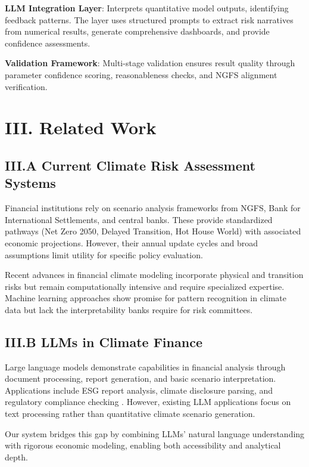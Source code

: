 \documentclass[10pt,twocolumn]{article}
\begin{document}
\textbf{LLM Integration Layer}: Interprets quantitative model outputs, identifying feedback patterns. The layer uses structured prompts to extract risk narratives from numerical results, generate comprehensive dashboards, and provide confidence assessments.

\textbf{Validation Framework}: Multi-stage validation ensures result quality through parameter confidence scoring, reasonableness checks, and NGFS alignment verification.

\section{III. Related Work}

\subsection{III.A Current Climate Risk Assessment Systems}

Financial institutions rely on scenario analysis frameworks from NGFS, Bank for International Settlements, and central banks. These provide standardized pathways (Net Zero 2050, Delayed Transition, Hot House World) with associated economic projections. However, their annual update cycles and broad assumptions limit utility for specific policy evaluation.

Recent advances in financial climate modeling \citep{bressan2022asset, dunz2021compounding, shobande2022sustainable} incorporate physical and transition risks but remain computationally intensive and require specialized expertise. Machine learning approaches show promise for pattern recognition in climate data but lack the interpretability banks require for risk committees.

\subsection{III.B LLMs in Climate Finance}

Large language models demonstrate capabilities in financial analysis through document processing, report generation, and basic scenario interpretation. Applications include ESG report analysis, climate disclosure parsing, and regulatory compliance checking \citep{cardenas2024financial, branzoli2024central, zhang2021investor, chevallier2020covid}. However, existing LLM applications focus on text processing rather than quantitative climate scenario generation.

Our system bridges this gap by combining LLMs' natural language understanding with rigorous economic modeling, enabling both accessibility and analytical depth.
\end{document}
